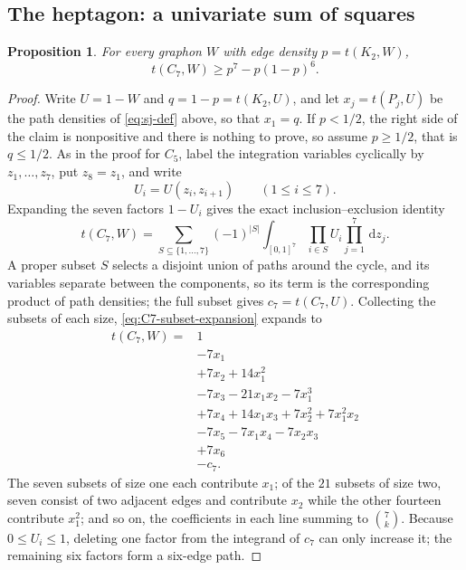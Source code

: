 \documentclass[11pt]{article}
\newtheorem{proposition}[theorem]{Proposition}
\numberwithin{equation}{section}
\newcommand{\dd}{\,\mathrm d}
\begin{document}
\subsection{The heptagon: a univariate sum of squares}\label{subsec:C7}

\begin{proposition}\label{prop:C7}
  For every graphon $W$ with edge density $p=t(K_2,W)$,
  \[
    t(C_7,W)\ge p^7-p(1-p)^6.
  \]
\end{proposition}

\begin{proof}
  Write $U=1-W$ and $q=1-p=t(K_2,U)$, and let $x_j=t(P_j,U)$ be the path densities of \eqref{eq:sj-def} above, so that $x_1=q$.
  If $p<1/2$, the right side of the claim is nonpositive and there is nothing to prove, so assume $p\ge1/2$, that is $q\le1/2$.
  As in the proof for $C_5$, label the integration variables cyclically by $z_1,\ldots,z_7$, put $z_8=z_1$, and write
  \[
    U_i=U(z_i,z_{i+1})\qquad(1\le i\le7).
  \]
  Expanding the seven factors $1-U_i$ gives the exact inclusion--exclusion identity
  \begin{equation}\label{eq:C7-subset-expansion}
    t(C_7,W)
    =\sum_{S\subseteq\{1,\ldots,7\}}(-1)^{|S|}
    \int_{[0,1]^7}\prod_{i\in S}U_i\prod_{j=1}^7\dd z_j.
  \end{equation}
  A proper subset $S$ selects a disjoint union of paths around the cycle, and its variables separate between the components, so its term is the corresponding product of path densities; the full subset gives $c_7=t(C_7,U)$.
  Collecting the subsets of each size, \eqref{eq:C7-subset-expansion} expands to
  \begin{align*}
    t(C_7,W)={}&1\\
    &-7x_1\\
    &+7x_2+14x_1^2\\
    &-7x_3-21x_1x_2-7x_1^3\\
    &+7x_4+14x_1x_3+7x_2^2+7x_1^2x_2\\
    &-7x_5-7x_1x_4-7x_2x_3\\
    &+7x_6\\
    &-c_7.
  \end{align*}
  The seven subsets of size one each contribute $x_1$; of the $21$ subsets of size two, seven consist of two adjacent edges and contribute $x_2$ while the other fourteen contribute $x_1^2$; and so on, the coefficients in each line summing to $\binom7k$.
  Because $0\le U_i\le1$, deleting one factor from the integrand of $c_7$ can only increase it; the remaining six factors form a six-edge path.

\end{proof}
\end{document}

